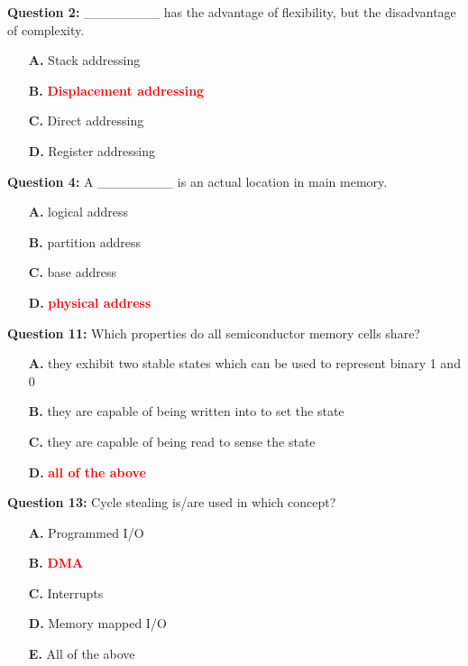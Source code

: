 \documentclass[12pt,a4paper]{article}
\begin{document}
\textbf{Question 2:} ________ has the advantage of flexibility, but the disadvantage of complexity.

\begin{itemize}
    \item[\textbf{A.}] Stack addressing
    \item[\textbf{B.}] \textcolor{red}{\textbf{Displacement addressing}}
    \item[\textbf{C.}] Direct addressing
    \item[\textbf{D.}] Register addressing
\end{itemize}

\vspace{0.5cm}

\textbf{Question 4:} A ________ is an actual location in main memory.

\begin{itemize}
    \item[\textbf{A.}] logical address
    \item[\textbf{B.}] partition address
    \item[\textbf{C.}] base address
    \item[\textbf{D.}] \textcolor{red}{\textbf{physical address}}
\end{itemize}

\vspace{0.5cm}

\textbf{Question 11:} Which properties do all semiconductor memory cells share?

\begin{itemize}
    \item[\textbf{A.}] they exhibit two stable states which can be used to represent binary 1 and 0
    \item[\textbf{B.}] they are capable of being written into to set the state
    \item[\textbf{C.}] they are capable of being read to sense the state
    \item[\textbf{D.}] \textcolor{red}{\textbf{all of the above}}
\end{itemize}

\vspace{0.5cm}

\textbf{Question 13:} Cycle stealing is/are used in which concept?

\begin{itemize}
    \item[\textbf{A.}] Programmed I/O
    \item[\textbf{B.}] \textcolor{red}{\textbf{DMA}}
    \item[\textbf{C.}] Interrupts
    \item[\textbf{D.}] Memory mapped I/O
    \item[\textbf{E.}] All of the above
\end{itemize}
\end{document}

